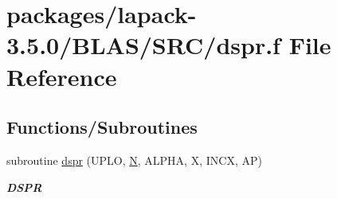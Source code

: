 \hypertarget{lapack-3_85_80_2BLAS_2SRC_2dspr_8f}{}\section{packages/lapack-\/3.5.0/\+B\+L\+A\+S/\+S\+R\+C/dspr.f File Reference}
\label{lapack-3_85_80_2BLAS_2SRC_2dspr_8f}
\subsection*{Functions/\+Subroutines}
\begin{DoxyCompactItemize}
\item 
subroutine \hyperlink{group__double__blas__level2_ga22adb497a4f41eabc6a8dcac6f326183}{dspr} (U\+P\+L\+O, \hyperlink{polmisc_8c_a0240ac851181b84ac374872dc5434ee4}{N}, A\+L\+P\+H\+A, X, I\+N\+C\+X, A\+P)
\begin{DoxyCompactList}\small\item\em {\bfseries D\+S\+P\+R} \end{DoxyCompactList}\end{DoxyCompactItemize}
